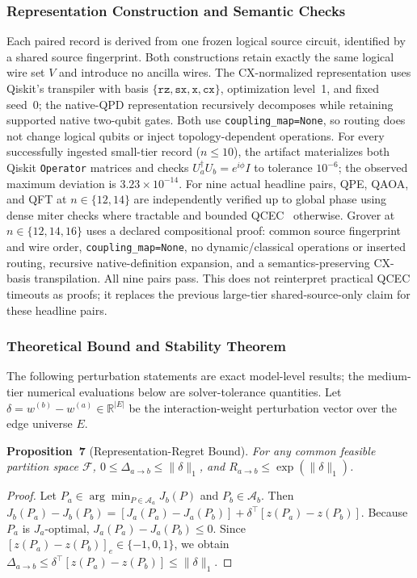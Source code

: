 \documentclass[11pt]{article}
\begin{document}
\subsubsection{Representation Construction and Semantic Checks}
Each paired record is derived from one frozen logical source circuit, identified by a shared source fingerprint. Both constructions retain exactly the same logical wire set $V$ and introduce no ancilla wires. The CX-normalized representation uses Qiskit's transpiler with basis $\{\texttt{rz},\texttt{sx},\texttt{x},\texttt{cx}\}$, optimization level~1, and fixed seed~0; the native-QPD representation recursively decomposes while retaining supported native two-qubit gates. Both use \texttt{coupling\_map=None}, so routing does not change logical qubits or inject topology-dependent operations. For every successfully ingested small-tier record ($n\le10$), the artifact materializes both Qiskit \texttt{Operator} matrices and checks $U_a^\dagger U_b=e^{i\phi}I$ to tolerance $10^{-6}$; the observed maximum deviation is $3.23\times10^{-14}$. For nine actual headline pairs, QPE, QAOA, and QFT at $n\in\{12,14\}$ are independently verified up to global phase using dense miter checks where tractable and bounded QCEC~\cite{peham2022zx_equivalence} otherwise. Grover at $n\in\{12,14,16\}$ uses a declared compositional proof: common source fingerprint and wire order, \texttt{coupling\_map=None}, no dynamic/classical operations or inserted routing, recursive native-definition expansion, and a semantics-preserving CX-basis transpilation. All nine pairs pass. This does not reinterpret practical QCEC timeouts as proofs; it replaces the previous large-tier shared-source-only claim for these headline pairs.

\subsubsection{Theoretical Bound and Stability Theorem}
The following perturbation statements are exact model-level results; the medium-tier numerical evaluations below are solver-tolerance quantities. Let $\delta = w^{(b)} - w^{(a)} \in \mathbb{R}^{|E|}$ be the interaction-weight perturbation vector over the edge universe $E$.

\textbf{Proposition~7} (Representation-Regret Bound). \textit{For any common feasible partition space $\mathcal{F}$, $0 \le \Delta_{a\to b} \le \|\delta\|_1$, and $R_{a\to b} \le \exp(\|\delta\|_1)$.}

\begin{proof} Let $P_a \in \arg\min_{P\in\mathcal{A}_a} J_b(P)$ and $P_b \in \mathcal{A}_b$. Then $J_b(P_a) - J_b(P_b) = [J_a(P_a) - J_a(P_b)] + \delta^\top [z(P_a) - z(P_b)]$. Because $P_a$ is $J_a$-optimal, $J_a(P_a) - J_a(P_b) \le 0$. Since $[z(P_a) - z(P_b)]_e \in \{-1,0,1\}$, we obtain $\Delta_{a\to b} \le \delta^\top [z(P_a) - z(P_b)] \le \|\delta\|_1$.\end{proof}
\end{document}
